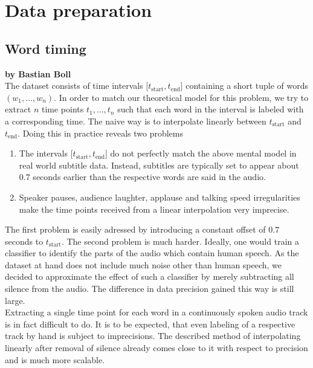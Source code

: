 \chapter{Data preparation}
\label{data_preparation}

\section{Word timing}

\textbf{by Bastian Boll} \\

The dataset consists of time intervals \(\lbrack t_\text{start}, t_\text{end}\rbrack\) containing a short tuple of words \((w_1,\dotsc,w_n)\). In order to match our theoretical model for this problem, we try to extract $n$ time points \(t_1,\dotsc,t_n\) such that each word in the interval is labeled with a corresponding time. The naive way is to interpolate linearly between \(t_\text{start}\) and \(t_\text{end}\). Doing this in practice reveals two problems
\begin{enumerate}
	\item The intervals \(\lbrack t_\text{start}, t_\text{end}\rbrack\) do not perfectly match the above mental model in real world subtitle data. Instead, subtitles are typically set to appear about $0.7$ seconds earlier than the respective words are said in the audio.
	\item Speaker pauses, audience laughter, applause and talking speed irregularities make the time points received from a linear interpolation very imprecise.
\end{enumerate}
The first problem is easily adressed by introducing a constant offset of $0.7$ seconds to $t_\text{start}$. The second problem is much harder. Ideally, one would train a classifier to identify the parts of the audio which contain human speech. As the dataset at hand does not include much noise other than human speech, we decided to approximate the effect of such a classifier by merely subtracting all silence from the audio. The difference in data precision gained this way is still large.\\
Extracting a single time point for each word in a continuously spoken audio track is in fact difficult to do. It is to be expected, that even labeling of a respective track by hand is subject to imprecisions. The described method of interpolating linearly after removal of silence already comes close to it with respect to precision and is much more scalable.

